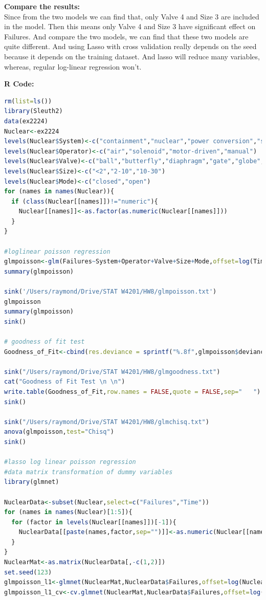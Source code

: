 \documentclass[10pt,letterpaper]{article}
\begin{document}
\textbf{Compare the results:}\\

Since from the two models we can find that, only Valve 4 and Size 3 are included in the model. Then this means only Valve 4 and Size 3 have significant effect on Failures. And compare the two models, we can find that these two models are quite different. And using Lasso with cross validation really depends on the seed because it depends on the training dataset. And lasso will reduce many variables, whereas, regular log-linear regression won't.


\newpage
\textbf{R Code:}
\begin{lstlisting}[language=R]
rm(list=ls())
library(Sleuth2)
data(ex2224)
Nuclear<-ex2224
levels(Nuclear$System)<-c("containment","nuclear","power conversion","safety","process auxiliary")
levels(Nuclear$Operator)<-c("air","solenoid","motor-driven","manual")
levels(Nuclear$Valve)<-c("ball","butterfly","diaphragm","gate","globe","directional control")
levels(Nuclear$Size)<-c("<2","2-10","10-30")
levels(Nuclear$Mode)<-c("closed","open")
for (names in names(Nuclear)){
  if (class(Nuclear[[names]])!="numeric"){
    Nuclear[[names]]<-as.factor(as.numeric(Nuclear[[names]]))
  }
}

#loglinear poisson regression 
glmpoisson<-glm(Failures~System+Operator+Valve+Size+Mode,offset=log(Time),data=Nuclear,family="poisson")
summary(glmpoisson)

sink('/Users/raymond/Drive/STAT W4201/HW8/glmpoisson.txt')
glmpoisson
summary(glmpoisson)
sink()

# goodness of fit test
Goodness_of_Fit<-cbind(res.deviance = sprintf("%.8f",glmpoisson$deviance),df = glmpoisson$df.residual, p.value = sprintf("%.8f",(1-pchisq(glmpoisson$deviance,glmpoisson$df.residual,lower.tail = FALSE))))

sink("/Users/raymond/Drive/STAT W4201/HW8/glmgoodness.txt")
cat("Goodness of Fit Test \n \n")
write.table(Goodness_of_Fit,row.names = FALSE,quote = FALSE,sep="   ")
sink()

sink("/Users/raymond/Drive/STAT W4201/HW8/glmchisq.txt")
anova(glmpoisson,test="Chisq")
sink()

#lasso log linear poisson regression
#data matrix transformation of dummy variables
library(glmnet)

NuclearData<-subset(Nuclear,select=c("Failures","Time"))
for (names in names(Nuclear)[1:5]){
  for (factor in levels(Nuclear[[names]])[-1]){
    NuclearData[[paste(names,factor,sep="")]]<-as.numeric(Nuclear[[names]]==factor)
  }
}
NuclearMat<-as.matrix(NuclearData[,-c(1,2)])
set.seed(123)
glmpoisson_l1<-glmnet(NuclearMat,NuclearData$Failures,offset=log(NuclearData$Time),family="poisson")
glmpoisson_l1_cv<-cv.glmnet(NuclearMat,NuclearData$Failures,offset=log(NuclearData$Time),family="poisson")


\end{lstlisting}
\end{document}
